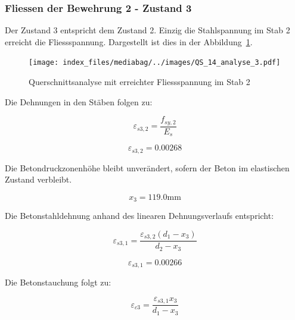 \documentclass[
  12pt,
  letterpaper,
  egregdoesnotlikesansseriftitles]{scrreprt}
\begin{document}
\hypertarget{fliessen-der-bewehrung-2---zustand-3}{%
\subsubsection{Fliessen der Bewehrung 2 - Zustand
3}\label{fliessen-der-bewehrung-2---zustand-3}}

Der Zustand 3 entspricht dem Zustand 2. Einzig die Stahlspannung im Stab
2 erreicht die Fliessspannung. Dargestellt ist dies in der
Abbildung~\ref{fig-qs4_sv14}.

\begin{figure}[H]

{\centering \texttt{[image: index\_files/mediabag/../images/QS\_14\_analyse\_3.pdf]}

}

\caption{\label{fig-qs4_sv14}Querschnittsanalyse mit erreichter
Fliessspannung im Stab 2}

\end{figure}

Die Dehnungen in den Stäben folgen zu:

\begin{equation}\varepsilon_{s3,2} = \frac{f_{sy,2}}{E_{s}}\end{equation}

\begin{equation}\varepsilon_{s3,2} = 0.00268\end{equation}

Die Betondruckzonenhöhe bleibt unverändert, sofern der Beton im
elastischen Zustand verbleibt.

\begin{equation}x_{3} = 119.0 \text{mm}\end{equation}

Die Betonstahldehnung anhand des linearen Dehnungsverlaufs entspricht:

\begin{equation}\varepsilon_{s3,1} = \frac{\varepsilon_{s3,2} \left(d_{1} - x_{3}\right)}{d_{2} - x_{3}}\end{equation}

\begin{equation}\varepsilon_{s3,1} = 0.00266\end{equation}

Die Betonstauchung folgt zu:

\begin{equation}\varepsilon_{c3} = \frac{\varepsilon_{s3,1} x_{3}}{d_{1} - x_{3}}\end{equation}
\end{document}
